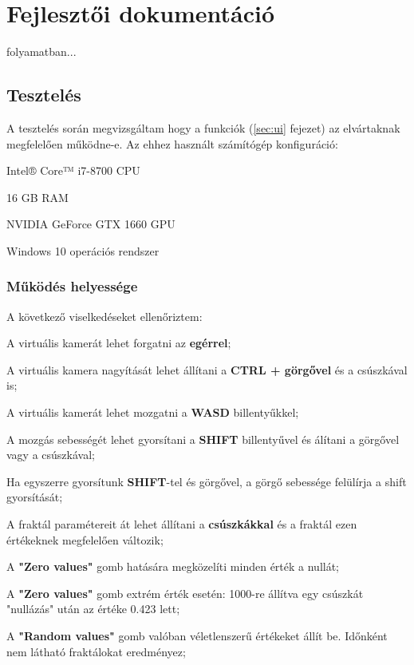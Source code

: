 \chapter{Fejlesztői dokumentáció} 
\label{ch:impl}

folyamatban...

\section{Tesztelés}

A tesztelés során megvizsgáltam hogy a funkciók (\ref{sec:ui} fejezet) az elvártaknak megfelelően működne-e. Az ehhez használt számítógép konfiguráció:
\begin{compactitem}
	\item Intel® Core™ i7-8700 CPU
	\item 16 GB RAM
	\item NVIDIA GeForce GTX 1660 GPU
	\item Windows 10 operációs rendszer
\end{compactitem}

\subsection{Működés helyessége}

A következő viselkedéseket ellenőriztem:
\begin{compactenum}
	\item A virtuális kamerát lehet forgatni az \textbf{egérrel};
	\item A virtuális kamera nagyítását lehet állítani a \textbf{CTRL + görgővel} és a csúszkával is;
	\item A virtuális kamerát lehet mozgatni a \textbf{WASD} billentyűkkel;
	\item A mozgás sebességét lehet gyorsítani a \textbf{SHIFT} billentyűvel és álítani a görgővel vagy a csúszkával;
	\item Ha egyszerre gyorsítunk \textbf{SHIFT}-tel és görgővel, a görgő sebessége felülírja a shift gyorsítását;
	\item A fraktál paramétereit át lehet állítani a \textbf{csúszkákkal} és a fraktál ezen értékeknek megfelelően változik;
	\item A \textbf{"Zero values"} gomb hatására megközelíti minden érték a nullát;
	\item A \textbf{"Zero values"} gomb extrém érték esetén: 1000-re állítva egy csúszkát "nullázás" után az értéke 0.423 lett;
	\item A \textbf{"Random values"} gomb valóban véletlenszerű értékeket állít be. Időnként nem látható fraktálokat eredményez;
\end{compactenum}

